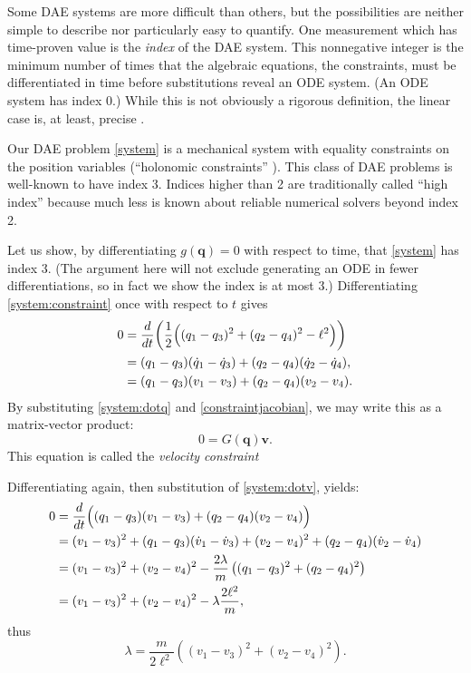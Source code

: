 \documentclass[letterpaper,final,12pt,reqno]{amsart}
\newcommand{\bq}{\mathbf{q}}
\newcommand{\bv}{\mathbf{v}}
\begin{document}
Some DAE systems are more difficult than others, but the possibilities are neither simple to describe nor particularly easy to quantify.  One measurement which has time-proven value is the \emph{index} of the DAE system.  This nonnegative integer is the minimum number of times that the algebraic equations, the constraints, must be differentiated in time before substitutions reveal an ODE system.  (An ODE system has index 0.)  While this is not obviously a rigorous definition, the linear case is, at least, precise \cite[Chapter IV.5]{HairerWanner1996}.

Our DAE problem \eqref{system} is a mechanical system with equality constraints on the position variables (``holonomic constraints'' \cite{Lanczos1970}).  This class of DAE problems is well-known to have index 3.  Indices higher than 2 are traditionally called ``high index'' because much less is known about reliable numerical solvers beyond index 2.

Let us show, by differentiating $g(\bq)=0$ with respect to time, that \eqref{system} has index 3.  (The argument here will not exclude generating an ODE in fewer differentiations, so in fact we show the index is at most 3.)  Differentiating \eqref{system:constraint} once with respect to $t$ gives
\begin{align}
0 &= \frac{d}{dt} \bigg(\frac{1}{2} \Big((q_1 - q_3)^2 + (q_2 - q_4)^2 - \ell^2\Big)\bigg) \notag \\
  &= (q_1 - q_3)(\dot q_1 - \dot q_3) + (q_2 - q_4) (\dot q_2 - \dot q_4), \notag \\
  &= (q_1 - q_3)(v_1 - v_3) + (q_2 - q_4) (v_2 - v_4). \label{rawvelocityconstraint}
\end{align}
By substituting \eqref{system:dotq} and \eqref{constraintjacobian}, we may write this as a matrix-vector product:
\begin{equation}
0 = G(\bq) \bv. \label{velocityconstraint}
\end{equation}
This equation is called the \emph{velocity constraint}

Differentiating again, then substitution of \eqref{system:dotv}, yields:
\begin{align}
0 &= \frac{d}{dt} \Big((q_1 - q_3)(v_1 - v_3) + (q_2 - q_4) (v_2 - v_4)\Big) \notag \\
  &= (v_1 - v_3)^2 + (q_1 - q_3) (\dot v_1 - \dot v_3) + (v_2 - v_4)^2 + (q_2 - q_4) (\dot v_2 - \dot v_4)  \notag \\
  &= (v_1 - v_3)^2 + (v_2 - v_4)^2 - \frac{2\lambda}{m} \left((q_1 - q_3)^2 + (q_2 - q_4)^2\right) \notag \\
  &= (v_1 - v_3)^2 + (v_2 - v_4)^2 - \lambda \frac{2 \ell^2}{m}, \label{rawddconstraint}
\end{align}
thus
\begin{equation}
\lambda = \frac{m}{2\ell^2} \left((v_1 - v_3)^2 + (v_2 - v_4)^2\right). \label{rawlambda}
\end{equation}
\end{document}
